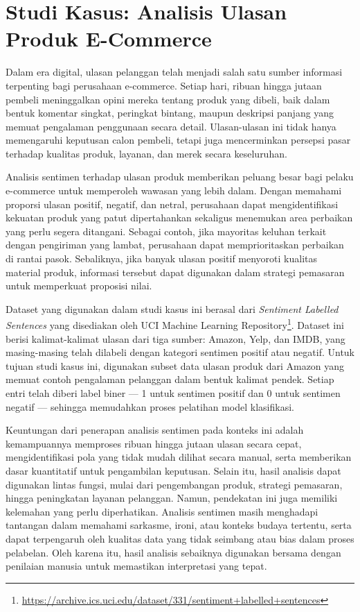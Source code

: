 \section{Studi Kasus: Analisis Ulasan Produk E-Commerce}

Dalam era digital, ulasan pelanggan telah menjadi salah satu sumber informasi terpenting bagi perusahaan e-commerce. Setiap hari, ribuan hingga jutaan pembeli meninggalkan opini mereka tentang produk yang dibeli, baik dalam bentuk komentar singkat, peringkat bintang, maupun deskripsi panjang yang memuat pengalaman penggunaan secara detail. Ulasan-ulasan ini tidak hanya memengaruhi keputusan calon pembeli, tetapi juga mencerminkan persepsi pasar terhadap kualitas produk, layanan, dan merek secara keseluruhan.

Analisis sentimen terhadap ulasan produk memberikan peluang besar bagi pelaku e-commerce untuk memperoleh wawasan yang lebih dalam. Dengan memahami proporsi ulasan positif, negatif, dan netral, perusahaan dapat mengidentifikasi kekuatan produk yang patut dipertahankan sekaligus menemukan area perbaikan yang perlu segera ditangani. Sebagai contoh, jika mayoritas keluhan terkait dengan pengiriman yang lambat, perusahaan dapat memprioritaskan perbaikan di rantai pasok. Sebaliknya, jika banyak ulasan positif menyoroti kualitas material produk, informasi tersebut dapat digunakan dalam strategi pemasaran untuk memperkuat proposisi nilai.

Dataset yang digunakan dalam studi kasus ini berasal dari \textit{Sentiment Labelled Sentences} yang disediakan oleh UCI Machine Learning Repository\footnote{\url{https://archive.ics.uci.edu/dataset/331/sentiment+labelled+sentences}}. Dataset ini berisi kalimat-kalimat ulasan dari tiga sumber: Amazon, Yelp, dan IMDB, yang masing-masing telah dilabeli dengan kategori sentimen positif atau negatif. Untuk tujuan studi kasus ini, digunakan subset data ulasan produk dari Amazon yang memuat contoh pengalaman pelanggan dalam bentuk kalimat pendek. Setiap entri telah diberi label biner — 1 untuk sentimen positif dan 0 untuk sentimen negatif — sehingga memudahkan proses pelatihan model klasifikasi.

Keuntungan dari penerapan analisis sentimen pada konteks ini adalah kemampuannya memproses ribuan hingga jutaan ulasan secara cepat, mengidentifikasi pola yang tidak mudah dilihat secara manual, serta memberikan dasar kuantitatif untuk pengambilan keputusan. Selain itu, hasil analisis dapat digunakan lintas fungsi, mulai dari pengembangan produk, strategi pemasaran, hingga peningkatan layanan pelanggan. Namun, pendekatan ini juga memiliki kelemahan yang perlu diperhatikan. Analisis sentimen masih menghadapi tantangan dalam memahami sarkasme, ironi, atau konteks budaya tertentu, serta dapat terpengaruh oleh kualitas data yang tidak seimbang atau bias dalam proses pelabelan. Oleh karena itu, hasil analisis sebaiknya digunakan bersama dengan penilaian manusia untuk memastikan interpretasi yang tepat.

